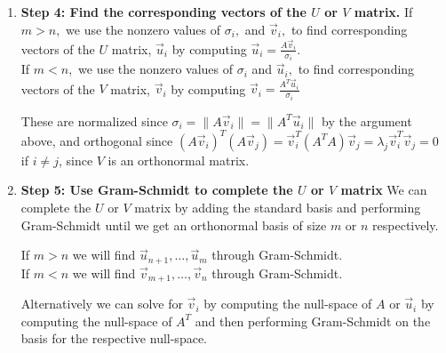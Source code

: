 \begin{enumerate}[label=(\roman*)]
  \item \textbf{Step 4: Find the corresponding vectors of the $U$ or $V$ matrix.}  \vskip 1pt
  If $m > n,$ we use the nonzero values of $\sigma_i,$ and $\vec{v}_i,$ to find corresponding vectors of the $U$ matrix, $\vec{u}_i$ by computing $\vec{u}_i = \frac{A\vec{v}_i}{\sigma_i}$. \\
  If $m < n,$ we use the nonzero values of $\sigma_i$ and $\vec{u}_i,$ to find corresponding vectors of the $V$ matrix, $\vec{v}_i$ by computing $\vec{v}_i = \frac{A^{T} \vec{u}_i}{\sigma_i}$

  These are normalized since $\sigma_i = \|A \vec{v}_i\| = \|A^{T} \vec{u}_i \|$ by the argument above, and orthogonal since $(A\vec{v}_i)^T(A\vec{v}_j) = \vec{v}_i^T(A^T A)\vec{v}_j = \lambda_j \vec{v}_i^T\vec{v}_j = 0$ if $i \neq j$, since $V$ is an orthonormal matrix. 

  \item \textbf{Step 5: Use Gram-Schmidt to complete the $U$ or $V$ matrix} \vskip 1pt
  We can complete the $U$ or $V$ matrix by adding the standard basis and performing Gram-Schmidt until we get an orthonormal basis of size $m$ or $n$ respectively.

  If $m > n$ we will find $\vec{u}_{n + 1}, \ldots, \vec{u}_{m}$ through Gram-Schmidt. \\
  If $m < n$ we will find $\vec{v}_{m + 1}, \ldots, \vec{v}_{n}$ through Gram-Schmidt.

  Alternatively we can solve for $\vec{v}_{i}$ by computing the null-space of $A$ or $\vec{u}_{i}$ by computing the null-space of $A^{T}$ and then performing Gram-Schmidt on the basis for the respective null-space.

\end{enumerate}

\newpage

